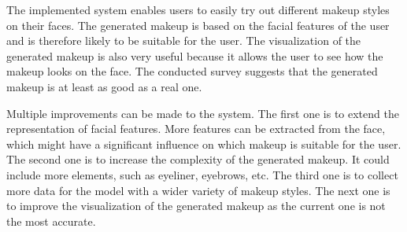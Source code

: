 \documentclass[conference]{IEEEtran}
\begin{document}
The implemented system enables users to easily try out different makeup styles on their faces.
The generated makeup is based on the facial features of the user and is therefore likely to be suitable for the user.
The visualization of the generated makeup is also very useful because it allows the user to see how the makeup looks on the face.
The conducted survey suggests that the generated makeup is at least as good as a real one.

Multiple improvements can be made to the system.
The first one is to extend the representation of facial features.
More features can be extracted from the face, which might have a significant influence on which makeup is suitable for the user.
The second one is to increase the complexity of the generated makeup.
It could include more elements, such as eyeliner, eyebrows, etc.
The third one is to collect more data for the model with a wider variety of makeup styles.
The next one is to improve the visualization of the generated makeup as the current one is not the most accurate.


\printbibliography
\end{document}
